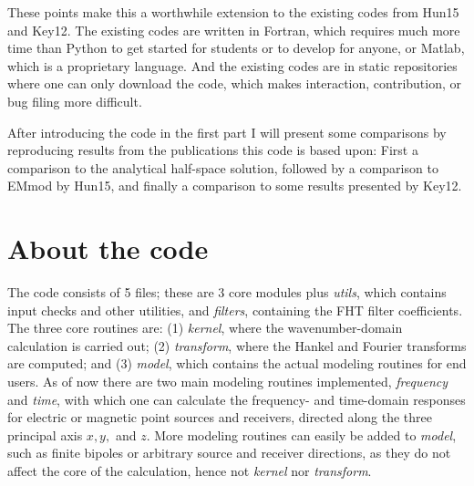 \documentclass[manuscript]{geophysics}
\newcommand{\tnt}[1]{#1}
\newcommand{\fortran}{\tnt{Fortran}\xspace}
\newcommand{\python}{\tnt{Python}\xspace}
\newcommand{\matlab}{\tnt{Matlab}\xspace}
\newcommand{\emmod}{\tnt{EMmod}\xspace}
\begin{document}
These points make this a worthwhile extension to the existing codes from Hun15
and Key12. The existing codes are written in \fortran, which requires much more
time than \python to get started for students or to develop for anyone, or
\matlab, which is a proprietary language. And the existing codes are in static
repositories where one can only download the code, which makes interaction,
contribution, or bug filing more difficult.

After introducing the code in the first part I will present some comparisons by
reproducing results from the publications this code is based upon: First a
comparison to the analytical half-space solution, followed by a comparison to
\emmod by Hun15, and finally a comparison to some results presented by Key12.


\section{About the code}

The code consists of 5 files; these are 3 core modules plus \emph{utils}, which
contains input checks and other utilities, and \emph{filters}, containing the
FHT filter coefficients. The three core routines are: (1) \emph{kernel}, where
the wavenumber-domain calculation is carried out; (2) \emph{transform}, where
the Hankel and Fourier transforms are computed; and (3) \emph{model}, which
contains the actual modeling routines for end users. As of now there are two
main modeling routines implemented, \emph{frequency} and \emph{time}, with
which one can calculate the frequency- and time-domain responses for electric
or magnetic point sources and receivers, directed along the three principal
axis $x, y,$ and $z$. More modeling routines can easily be added to
\emph{model}, such as finite bipoles or arbitrary source and receiver
directions, as they do not affect the core of the calculation, hence not
\emph{kernel} nor \emph{transform}.
\end{document}
